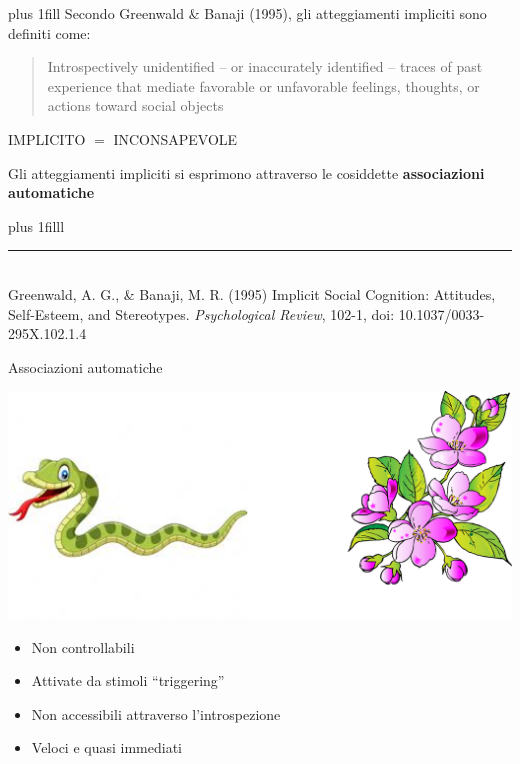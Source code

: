 \documentclass[compress]{beamer}
\begin{document}
\begin{frame}
	\vskip0pt plus 1fill
	Secondo Greenwald \& Banaji (1995), gli atteggiamenti impliciti sono definiti come:
	
	\vspace{5mm}
	\begin{quote}
		Introspectively unidentified -- or inaccurately identified -- traces of past experience that mediate favorable or unfavorable feelings, thoughts, or actions toward social objects
	\end{quote}

\begin{center}
	\begin{large}
		IMPLICITO $=$ INCONSAPEVOLE
	\end{large}
\end{center}

Gli atteggiamenti impliciti si esprimono attraverso le cosiddette \textbf{associazioni automatiche}


\vskip0pt plus 1filll

\color{template}\rule{0.30\linewidth}{0.5pt}\\
\color{black}
\scriptsize{Greenwald, A. G., \& Banaji, M. R. (1995) Implicit Social Cognition: Attitudes, Self-Esteem, and Stereotypes.\emph{ Psychological Review}, 102-1, doi: 10.1037/0033-295X.102.1.4}


\end{frame}

\begin{frame}{Associazioni automatiche}
	\begin{center}
		\includegraphics[width=.50\linewidth]{snakeFlower.png}
	\end{center}

\begin{itemize}
	\item Non controllabili
	\item Attivate da stimoli ``triggering'' 
	\item Non accessibili attraverso l'introspezione 
	\item Veloci e quasi immediati
\end{itemize}
	
	
\end{frame}
\end{document}
